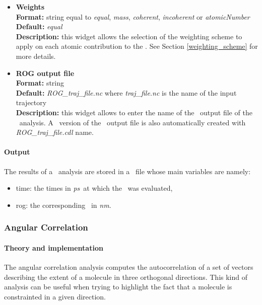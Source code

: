 \documentclass[a4paper,11pt]{report}
\newcommand{\nm}{\textit{nm}}
\newcommand{\ps}{\textit{ps}}
\begin{document}
\begin{itemize}
\item \textbf{Weights}\\
\textbf{Format:} string equal to \textit{equal}, \textit{mass}, \textit{coherent}, \textit{incoherent} or \textit{atomicNumber}\\
\textbf{Default:} \textit{equal}\\
\textbf{Description:} this widget allows the selection of the weighting scheme to apply on each atomic contribution 
to the \ROG. See Section \ref{weighting_scheme} for more details. 

\item \textbf{ROG output file}\\
\textbf{Format:} string\\
\textbf{Default:} \textit{ROG\_traj\_file.nc} where \textit{traj\_file.nc} is the name of the input trajectory\\
\textbf{Description:} this widget allows to enter the name of the \NetCDF\ output file of the \ROG\ analysis. A \CDL\ 
version of the \NetCDF\ output file is also automatically created with \textit{ROG\_traj\_file.cdl} name.
\end{itemize}

\paragraph{Output\\}
The results of a \ROG\ analysis are stored in a \NetCDF\ file whose main variables are namely:
\begin{itemize}
\item time: the times in \ps\ at which the \ROG\ was evaluated,
\item rog: the corresponding \ROG\ in \nm .
\end{itemize}

\subsubsection{Angular Correlation}
\label{ac}
\paragraph{Theory and implementation\\}
\label{ac_theory}
The angular correlation analysis computes the autocorrelation of a set of vectors describing the extent of a molecule in three 
orthogonal directions. This kind of analysis can be useful when trying to highlight the fact that a molecule is constrainted 
in a given direction.
\end{document}
